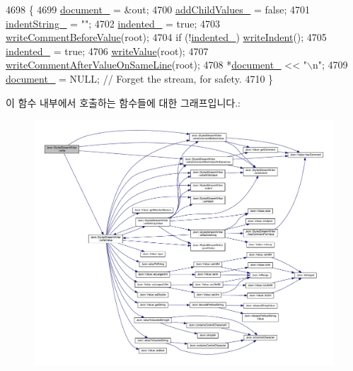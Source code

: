 \begin{DoxyCode}
4698                                                                       \{
4699   \hyperlink{class_json_1_1_styled_stream_writer_aa8c4e4576f5c3dcb10955d133a092dd6}{document\_} = &out;
4700   \hyperlink{class_json_1_1_styled_stream_writer_a4e4bb7fc223b2652b72b523b1ce414fa}{addChildValues\_} = \textcolor{keyword}{false};
4701   \hyperlink{class_json_1_1_styled_stream_writer_a1481433ebe1491ea83b0beb92aed56c2}{indentString\_} = \textcolor{stringliteral}{""};
4702   \hyperlink{class_json_1_1_styled_stream_writer_aa12db1753619a9b48da41f3e45e3275d}{indented\_} = \textcolor{keyword}{true};
4703   \hyperlink{class_json_1_1_styled_stream_writer_a79c3c2b320475035c47b2db484a3e434}{writeCommentBeforeValue}(root);
4704   \textcolor{keywordflow}{if} (!\hyperlink{class_json_1_1_styled_stream_writer_aa12db1753619a9b48da41f3e45e3275d}{indented\_}) \hyperlink{class_json_1_1_styled_stream_writer_a5a52fa5b406f1580a61dde3b5638e76d}{writeIndent}();
4705   \hyperlink{class_json_1_1_styled_stream_writer_aa12db1753619a9b48da41f3e45e3275d}{indented\_} = \textcolor{keyword}{true};
4706   \hyperlink{class_json_1_1_styled_stream_writer_a4359250e09273fa0144021684be001ae}{writeValue}(root);
4707   \hyperlink{class_json_1_1_styled_stream_writer_ad2ca860e317ca91d6b2932535b4ce9c7}{writeCommentAfterValueOnSameLine}(root);
4708   *\hyperlink{class_json_1_1_styled_stream_writer_aa8c4e4576f5c3dcb10955d133a092dd6}{document\_} << \textcolor{stringliteral}{"\(\backslash\)n"};
4709   \hyperlink{class_json_1_1_styled_stream_writer_aa8c4e4576f5c3dcb10955d133a092dd6}{document\_} = NULL; \textcolor{comment}{// Forget the stream, for safety.}
4710 \}
\end{DoxyCode}
이 함수 내부에서 호출하는 함수들에 대한 그래프입니다.\+:
\nopagebreak
\begin{figure}[H]
\begin{center}
\leavevmode
\includegraphics[width=350pt]{class_json_1_1_styled_stream_writer_a5d89d984fe675641e42c4370cd247774_cgraph}
\end{center}
\end{figure}
